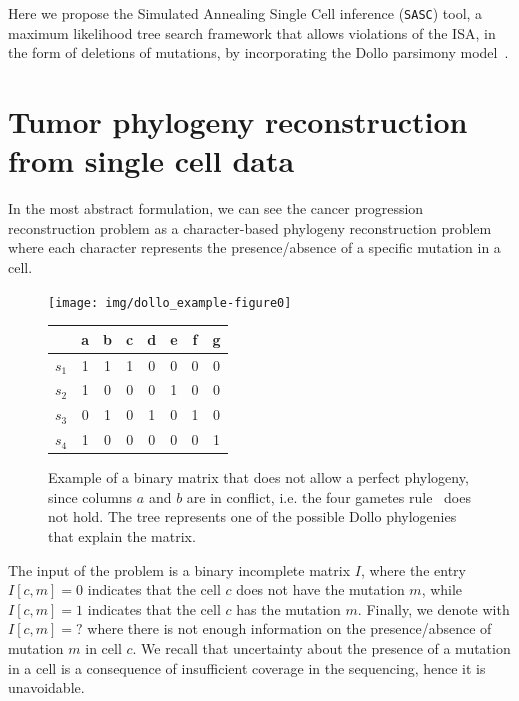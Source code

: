 \documentclass[a4paper,USenglish]{article}
\theoremstyle{definition}
\begin{document}
Here we propose the Simulated Annealing Single Cell inference (\texttt{SASC}) tool, a maximum likelihood tree search framework that allows violations of the ISA, in the form of deletions of mutations, by incorporating the Dollo parsimony model~\cite{Farris_1977}.

\section{Tumor phylogeny reconstruction from single cell data}

In the most abstract formulation, we can see the cancer progression reconstruction problem
as a
character-based phylogeny reconstruction problem~\cite{Gusfield} where each character
represents  the presence/absence of a specific mutation in a cell.


\begin{figure}[tb!]
  \begin{minipage}[c]{0.55\textwidth}
     \texttt{[image: img/dollo\_example-figure0]}
\end{minipage}
\begin{minipage}[t]{0.3\textwidth}
        \begin{tabular}[!t]{c|ccccccc}
             & a & b & c & d & e & f & g  \\ \hline
            $s_1$ & 1 & 1 & 1 & 0 & 0 & 0 & 0 \\
            $s_2$ & 1 & 0 & 0 & 0 & 1 & 0 & 0 \\
            $s_3$ & 0 & 1 & 0 & 1 & 0 & 1 & 0 \\
            $s_4$ & 1 & 0 & 0 & 0 & 0 & 0 & 1
        \end{tabular}
        \end{minipage}
  \caption{Example of a binary matrix that does not allow a perfect phylogeny, since columns $a$ and $b$ are in conflict, i.e. the four gametes rule~\cite{gusfield1991}
  does not hold. The tree represents one of the possible Dollo phylogenies that explain the matrix.}
\label{fig:dollo}
\end{figure}

The input of the problem is a binary incomplete matrix $I$, where the entry $I[c,m]=0$ indicates
that the cell $c$ does not have the mutation $m$, while $I[c,m]=1$ indicates that the
cell $c$ has the mutation $m$.
Finally, we denote with $I[c,m]=?$ where there is not enough information on the
presence/absence of mutation $m$ in cell $c$. 
We recall that uncertainty about the presence of a mutation in a cell is a consequence of
insufficient coverage in the sequencing, hence it is unavoidable.
\end{document}
